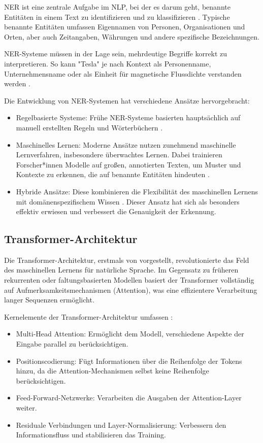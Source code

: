 \gls{NER} ist eine zentrale Aufgabe im \gls{NLP}, bei der es darum geht, benannte Entitäten in einem Text zu identifizieren und zu klassifizieren \parencite{nadeau2007survey}. 
Typische benannte Entitäten umfassen Eigennamen von Personen, Organisationen und Orten, aber auch Zeitangaben, Währungen und andere spezifische Bezeichnungen.

\gls{NER}-Systeme müssen in der Lage sein, mehrdeutige Begriffe korrekt zu interpretieren. So kann "Tesla" je nach Kontext als Personenname, Unternehmensname oder als Einheit für magnetische Flussdichte verstanden werden \parencite{RebalaGopinath2019AItM}.

Die Entwicklung von \gls{NER}-Systemen hat verschiedene Ansätze hervorgebracht:

\begin{itemize}
	\item Regelbasierte Systeme: Frühe \gls{NER}-Systeme basierten hauptsächlich auf manuell erstellten Regeln und Wörterbüchern \parencite{nadeau2007survey}.
	\item Maschinelles Lernen: Moderne Ansätze nutzen zunehmend maschinelle Lernverfahren, insbesondere überwachtes Lernen. Dabei trainieren Forscher*innen Modelle auf großen, annotierten Texten, um Muster und Kontexte zu erkennen, die auf benannte Entitäten hindeuten \parencite{nadeau2007survey}.
	\item Hybride Ansätze: Diese kombinieren die Flexibilität des maschinellen Lernens mit domänenspezifischem Wissen \parencite{nadeau2007survey}. Dieser Ansatz hat sich als besonders effektiv erwiesen und verbessert die Genauigkeit der Erkennung.
\end{itemize}

\subsection{Transformer-Architektur}
\label{subsec:transformer-architecture}

Die Transformer-Architektur, erstmals von \textcite{VaswaniAshish2023AIAY} vorgestellt, revolutionierte das Feld des maschinellen Lernens für natürliche Sprache. Im Gegensatz zu früheren rekurrenten oder faltungsbasierten Modellen basiert der Transformer vollständig auf Aufmerksamkeitsmechanismen (Attention), was eine effizientere Verarbeitung langer Sequenzen ermöglicht.

Kernelemente der Transformer-Architektur umfassen \parencite{VaswaniAshish2023AIAY}:

\begin{itemize}
	\item Multi-Head Attention: Ermöglicht dem Modell, verschiedene Aspekte der Eingabe parallel zu berücksichtigen.
	\item Positionscodierung: Fügt Informationen über die Reihenfolge der Tokens hinzu, da die Attention-Mechanismen selbst keine Reihenfolge berücksichtigen.
	\item Feed-Forward-Netzwerke: Verarbeiten die Ausgaben der Attention-Layer weiter.
	\item Residuale Verbindungen und Layer-Normalisierung: Verbessern den Informationsfluss und stabilisieren das Training.
\end{itemize}

